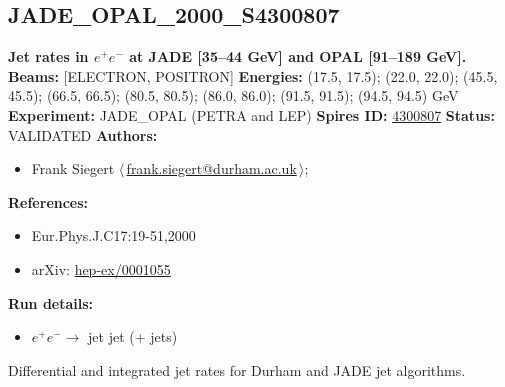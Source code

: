 \subsection[JADE\_OPAL\_2000\_S4300807]{JADE\_OPAL\_2000\_S4300807\,\cite{Pfeifenschneider:1999rz}}
\textbf{Jet rates in $e^+e^-$ at JADE [35--44 GeV] and OPAL [91--189 GeV].}\newline
\textbf{Beams:} [ELECTRON, POSITRON] \newline
\textbf{Energies:} (17.5, 17.5); (22.0, 22.0); (45.5, 45.5); (66.5, 66.5); (80.5, 80.5); (86.0, 86.0); (91.5, 91.5); (94.5, 94.5) GeV \newline
\textbf{Experiment:} JADE_OPAL (PETRA and LEP) \newline
\textbf{Spires ID:} \href{http://www.slac.stanford.edu/spires/find/hep/www?rawcmd=key+4300807}{4300807}\newline
\textbf{Status:} VALIDATED\newline
\textbf{Authors:}
\begin{itemize}
  \item Frank Siegert $\langle\,$\href{mailto:frank.siegert@durham.ac.uk}{frank.siegert@durham.ac.uk}$\,\rangle$;
\end{itemize}
\textbf{References:}
\begin{itemize}
  \item Eur.Phys.J.C17:19-51,2000
  \item arXiv: \href{http://arxiv.org/abs/hep-ex/0001055}{hep-ex/0001055}
\end{itemize}
\textbf{Run details:}
\begin{itemize}

  \item $e^+ e^- \to$ jet jet (+ jets)\end{itemize}

\noindent Differential and integrated jet rates for Durham and JADE jet algorithms.

\clearpage


\clearpage

